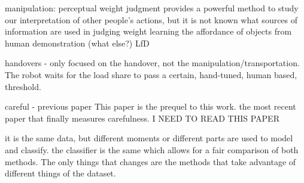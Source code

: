 manipulation:
\cite{hamilton_kinematic_2007} perceptual weight judgment provides a powerful method to study our interpretation of other people's actions, but it is not known what sources of information are used in judging weight
\cite{kjellstrom_visual_2011} learning the affordance of objects from human demonstration (what else?)
\cite{santina_learning_2019} LfD

handovers - 
\cite{Medina2016} only focused on the handover, not the manipulation/transportation. The robot waits for the load share to pass a certain, hand-tuned, human based, threshold.

careful - 
previous paper \cite{duarte_human_2020} This paper is the prequel to this work.
\cite{lastrico_careful_2021} the most recent paper that finally measures carefulness. I NEED TO READ THIS PAPER

it is the same data, but different moments or different parts are used to model and classify. the classifier is the same which allows for a fair comparison of both methods. The only things that changes are the methods that take advantage of different things of the dataset.


